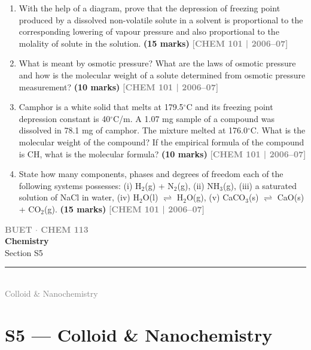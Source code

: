 \documentclass[12pt,a3paper]{article}
\newcommand{\yr}[1]{\hfill\textcolor{gray}{\small\textbf{[#1]}}}
\newcommand{\mk}[1]{\textcolor{orange!70!black}{\small\textbf{(#1 marks)}}}
\newcommand{\secdivider}[4]{%
  \newpage\thispagestyle{empty}%
  \vspace*{\fill}%
  \begin{tcolorbox}[enhanced,colback=#4!7,colframe=#3,boxrule=1.5pt,arc=8pt,
    left=20pt,right=20pt,top=22pt,bottom=22pt,
    shadow={3pt}{-3pt}{0pt}{black!15}]
    \centering
    {\large\textcolor{gray}{\textbf{BUET $\cdot$ CHEM 113}}}\\[8pt]
    {\fontsize{26}{32}\selectfont\bfseries\textcolor{#3}{Chemistry}}\\[6pt]
    {\fontsize{15}{19}\selectfont\textcolor{dgray}{#1}}\\[12pt]
    \textcolor{#3!60}{\rule{0.5\textwidth}{0.5pt}}\\[6pt]
    {\small\textcolor{gray}{#2}}
  \end{tcolorbox}%
  \vspace*{\fill}\newpage%
}
\begin{document}
\begin{enumerate}
\item With the help of a diagram, prove that the depression of freezing point produced by a dissolved non-volatile solute in a solvent is proportional to the corresponding lowering of vapour pressure and also proportional to the molality of solute in the solution. \mk{15}
\yr{CHEM 101 | 2006--07}



\item What is meant by osmotic pressure? What are the laws of osmotic pressure and how is the molecular weight of a solute determined from osmotic pressure measurement? \mk{10}
\yr{CHEM 101 | 2006--07}



\item Camphor is a white solid that melts at 179.5$^\circ$C and its freezing point depression constant is 40$^\circ$C/m. A 1.07 mg sample of a compound was dissolved in 78.1 mg of camphor. The mixture melted at 176.0$^\circ$C. What is the molecular weight of the compound? If the empirical formula of the compound is CH, what is the molecular formula? \mk{10}
\yr{CHEM 101 | 2006--07}



\item State how many components, phases and degrees of freedom each of the following systems possesses: (i) H$_2$(g) + N$_2$(g), (ii) NH$_3$(g), (iii) a saturated solution of NaCl in water, (iv) H$_2$O(l) $\rightleftharpoons$ H$_2$O(g), (v) CaCO$_3$(s) $\rightleftharpoons$ CaO(s) + CO$_2$(g). \mk{15}
\yr{CHEM 101 | 2006--07}



\end{enumerate}
\newpage



\secdivider{Section S5}{Colloid \& Nanochemistry}{cE}{cE}
\label{sec:S5}
\section{S5 --- Colloid \& Nanochemistry}
\end{document}
